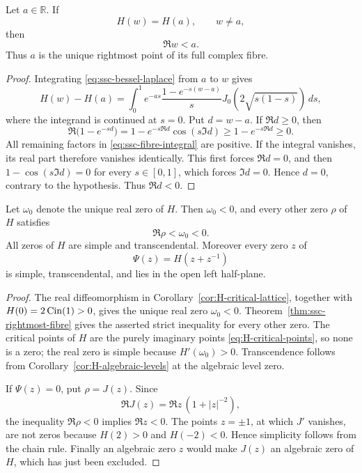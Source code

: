 \begin{theorem}
\label{thm:ssc-rightmost-fibre}
Let \(a\in\mathbb R\).  If
\[
 H(w)=H(a),\qquad w\ne a,
\]
then
\begin{equation}\label{eq:ssc-rightmost-fibre}
 \Re w<a.
\end{equation}
Thus \(a\) is the unique rightmost point of its full complex fibre.
\end{theorem}

\begin{proof}
Integrating \eqref{eq:ssc-bessel-laplace} from \(a\) to \(w\) gives
\begin{equation}\label{eq:ssc-fibre-integral}
 H(w)-H(a)=\int_0^1 e^{-as}
 \frac{1-e^{-s(w-a)}}{s}
 J_0\!\left(2\sqrt{s(1-s)}\right)\,ds,
\end{equation}
where the integrand is continued at \(s=0\).  Put \(d=w-a\).  If
\(\Re d\geq0\), then
\[
 \Re\bigl(1-e^{-sd}\bigr)
 =1-e^{-s\Re d}\cos(s\Im d)
 \geq1-e^{-s\Re d}\geq0.
\]
All remaining factors in \eqref{eq:ssc-fibre-integral} are positive.
If the integral vanishes, its real part therefore vanishes identically.
This first forces \(\Re d=0\), and then
\(1-\cos(s\Im d)=0\) for every \(s\in[0,1]\), which forces
\(\Im d=0\).  Hence \(d=0\), contrary to the hypothesis.  Thus
\(\Re d<0\).
\end{proof}

\begin{corollary}
\label{cor:ssc-hurwitz-stability}
Let \(\omega_0\) denote the unique real zero of \(H\).  Then
\(\omega_0<0\), and every other zero \(\rho\) of \(H\) satisfies
\[
 \Re\rho<\omega_0<0.
\]
All zeros of \(H\) are simple and transcendental.  Moreover every zero
\(z\) of
\[
 \Psi(z)=H(z+z^{-1})
\]
is simple, transcendental, and lies in the open left half-plane.
\end{corollary}

\begin{proof}
The real diffeomorphism in Corollary~\ref{cor:H-critical-lattice}, together
with \(H(0)=2\operatorname{Cin}(1)>0\), gives the unique real zero \(\omega_0<0\).
Theorem~\ref{thm:ssc-rightmost-fibre} gives the asserted strict inequality
for every other zero.  The critical points of \(H\) are the purely
imaginary points \eqref{eq:H-critical-points}, so none is a zero; the real
zero is simple because \(H'(\omega_0)>0\).  Transcendence follows from
Corollary~\ref{cor:H-algebraic-levels} at the algebraic level zero.

If \(\Psi(z)=0\), put \(\rho=J(z)\).  Since
\[
 \Re J(z)=\Re z\,(1+|z|^{-2}),
\]
the inequality \(\Re\rho<0\) implies \(\Re z<0\).  The points
\(z=\pm1\), at which \(J'\) vanishes, are not zeros because
\(H(2)>0\) and \(H(-2)<0\).  Hence simplicity follows from the chain
rule.  Finally an algebraic zero \(z\) would make \(J(z)\) an algebraic
zero of \(H\), which has just been excluded.
\end{proof}

